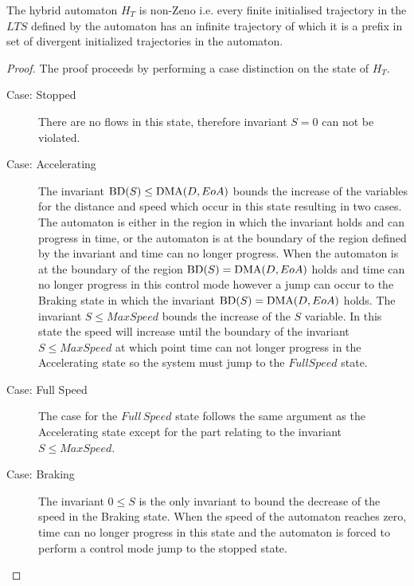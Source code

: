 \begin{mytheorem}
The hybrid automaton  $H_{T}$ is non-Zeno i.e. every finite initialised trajectory in the $LTS$ defined by the automaton has an infinite trajectory of which it is a prefix in set of divergent initialized trajectories in the automaton.
\begin{proof}
The proof proceeds by performing a case distinction on the state of $H_{T}$.
\begin{description}
\item[Case: Stopped] There are no flows in this state, therefore invariant $S = 0$ can not be violated.


\item[Case: Accelerating] The invariant $\mathrm{BD}(S) \leq \mathrm{DMA}(D,EoA)$ bounds the increase of the variables for the distance and speed which occur in this state resulting in two cases. The automaton is either in the region in which the invariant holds and can progress in time, or the automaton is at the boundary of the region defined by the invariant and time can no longer progress. When the automaton is at the boundary of the region $\mathrm{BD}(S) = \mathrm{DMA}(D,EoA)$ holds and time can no longer progress in this control mode however a jump can occur to the Braking state in which the invariant $\mathrm{BD}(S) = \mathrm{DMA}(D,EoA)$ holds. The invariant $S \leq MaxSpeed$ bounds the increase of the $S$ variable. In this state the speed will increase until the boundary of the invariant $S \leq MaxSpeed$ at which point time can not longer progress in the Accelerating state so the system must jump to the $Full Speed$ state.


\item[Case: Full Speed] 
The case for the $Full \, Speed$ state follows the same argument as the Accelerating state except for the part relating to the invariant $S \leq MaxSpeed$.

\item[Case: Braking]
The invariant $0 \leq S$ is the only invariant to bound the decrease of the speed in the Braking state. When the speed of  the automaton reaches zero, time can no longer progress in this state and the automaton is forced to perform a control mode jump to the stopped state.
\end{description}
\end{proof}
\end{mytheorem}





